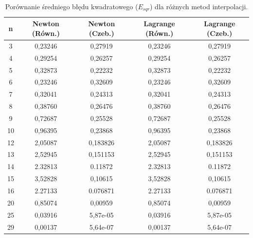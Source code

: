 \documentclass{article}
\begin{document}
\begin{table}[htbp]
\centering
\caption{Porównanie średniego błędu kwadratowego ($E_{sqr}$) dla różnych metod interpolacji.}
\label{tab:mse_error}
\begin{tabular}{@{}ccccc@{}}
\toprule
\textbf{n} & \textbf{Newton (Równ.)} & \textbf{Newton (Czeb.)} & \textbf{Lagrange (Równ.)} & \textbf{Lagrange (Czeb.)} \\ \midrule
3          & 0,23246                 & 0,27919                 & 0,23246                   & 0,27919                   \\
4          & 0,29254                 & 0,26257                 & 0,29254                   & 0,26257                   \\
5          & 0,32873                 & 0,22232                 & 0,32873                   & 0,22232                   \\
6          & 0,23246                 & 0,32609                 & 0,23246                   & 0,32609                   \\
7          & 0,32041                 & 0,24313                 & 0,32041                   & 0,24313                   \\
8          & 0,38760                 & 0,26476                 & 0,38760                   & 0,26476                   \\
9          & 0,72687                 & 0,25528                 & 0,72687                   & 0,25528                   \\
10         & 0,96395                 & 0,23868                 & 0,96395                   & 0,23868                   \\
12         & 2,05087                 & 0,183826                & 2,05087                   & 0,183826                  \\
13         & 2,52945                 & 0,151153                & 2,52945                   & 0,151153                  \\
14         & 2.32813                 & 0.11872                 & 2.32813                   & 0.11872                   \\
15         & 3,52828                 & 0,10615                 & 3,52828                   & 0,10615                   \\
16         & 2.27133                 & 0.076871                & 2.27133                   & 0.076871                  \\   
20         & 0,85074                 & 0,00959                 & 0,85074                   & 0,00959                   \\
25         & 0,03916                 & 5,87e-05                & 0,03916                   & 5,87e-05                  \\
29         & 0,00137                 & 5,64e-07                & 0,00137                   & 5,64e-07                  \\ \bottomrule
\end{tabular}
\end{table}
\end{document}
